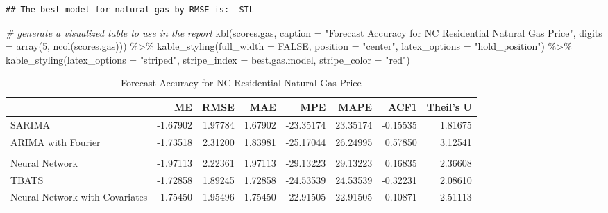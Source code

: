 \documentclass[
]{article}
\newenvironment{Shaded}{\begin{snugshade}}{\end{snugshade}}
\newcommand{\AttributeTok}[1]{\textcolor[rgb]{0.77,0.63,0.00}{#1}}
\newcommand{\CommentTok}[1]{\textcolor[rgb]{0.56,0.35,0.01}{\textit{#1}}}
\newcommand{\ConstantTok}[1]{\textcolor[rgb]{0.00,0.00,0.00}{#1}}
\newcommand{\DecValTok}[1]{\textcolor[rgb]{0.00,0.00,0.81}{#1}}
\newcommand{\FunctionTok}[1]{\textcolor[rgb]{0.00,0.00,0.00}{#1}}
\newcommand{\NormalTok}[1]{#1}
\newcommand{\SpecialCharTok}[1]{\textcolor[rgb]{0.00,0.00,0.00}{#1}}
\newcommand{\StringTok}[1]{\textcolor[rgb]{0.31,0.60,0.02}{#1}}
\begin{document}
\begin{verbatim}
## The best model for natural gas by RMSE is:  STL
\end{verbatim}

\begin{Shaded}
\begin{Highlighting}[]
\CommentTok{\# generate a visualized table to use in the report}
\FunctionTok{kbl}\NormalTok{(scores.gas,}
    \AttributeTok{caption =} \StringTok{"Forecast Accuracy for NC Residential Natural Gas Price"}\NormalTok{,}
    \AttributeTok{digits =} \FunctionTok{array}\NormalTok{(}\DecValTok{5}\NormalTok{, }\FunctionTok{ncol}\NormalTok{(scores.gas))) }\SpecialCharTok{\%\textgreater{}\%} 
  \FunctionTok{kable\_styling}\NormalTok{(}\AttributeTok{full\_width =} \ConstantTok{FALSE}\NormalTok{, }\AttributeTok{position =} \StringTok{"center"}\NormalTok{, }
                \AttributeTok{latex\_options =} \StringTok{"hold\_position"}\NormalTok{) }\SpecialCharTok{\%\textgreater{}\%} 
  \FunctionTok{kable\_styling}\NormalTok{(}\AttributeTok{latex\_options =} \StringTok{"striped"}\NormalTok{, }
                \AttributeTok{stripe\_index =}\NormalTok{ best.gas.model,}
                \AttributeTok{stripe\_color =} \StringTok{"red"}\NormalTok{)}
\end{Highlighting}
\end{Shaded}

\begin{table}[!h]

\caption{\label{tab:unnamed-chunk-21}Forecast Accuracy for NC Residential Natural Gas Price}
\centering
\begin{tabular}[t]{l|r|r|r|r|r|r|r}
\hline
  & ME & RMSE & MAE & MPE & MAPE & ACF1 & Theil's U\\
\hline
SARIMA & -1.67902 & 1.97784 & 1.67902 & -23.35174 & 23.35174 & -0.15535 & 1.81675\\
\hline
ARIMA with Fourier & -1.73518 & 2.31200 & 1.83981 & -25.17044 & 26.24995 & 0.57850 & 3.12541\\
\hline
\cellcolor{red}{STL} & \cellcolor{red}{-1.04788} & \cellcolor{red}{1.35599} & \cellcolor{red}{1.11314} & \cellcolor{red}{-14.03428} & \cellcolor{red}{14.80904} & \cellcolor{red}{-0.33348} & \cellcolor{red}{1.28849}\\
\hline
Neural Network & -1.97113 & 2.22361 & 1.97113 & -29.13223 & 29.13223 & 0.16835 & 2.36608\\
\hline
TBATS & -1.72858 & 1.89245 & 1.72858 & -24.53539 & 24.53539 & -0.32231 & 2.08610\\
\hline
Neural Network with Covariates & -1.75450 & 1.95496 & 1.75450 & -22.91505 & 22.91505 & 0.10871 & 2.51113\\
\hline
\end{tabular}
\end{table}
\end{document}
